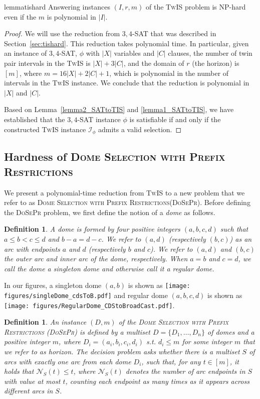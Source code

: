 \documentclass[letterpaper,11pt]{article}
\newtheorem{definition}[theorem]{Definition}
\newcommand{\sssattt}{\textsc{$3,4$-SAT}\xspace}
\newcommand{\tis}{\textsc{TwIS}\xspace}
\newcommand{\dspr}{\textsc{DoSePr}\xspace}
\newcommand{\dsprlong}{\textsc{Dome Selection with Prefix Restrictions}\xspace}
\begin{document}
\begin{restatable}{lemma}{tishard}\label{thm:1}
Answering instances $(I,r,m)$ of the \tis problem is NP-hard even if the $m$ is polynomial in $|I|$. 
\end{restatable}

\begin{proof}We will use the reduction from \sssattt that was described in Section~\ref{sec:tishard}. This reduction takes polynomial time. 
In particular, given an instance of \sssattt, $\phi$ with $|X|$ variables and $|C|$ clauses, the number of twin pair intervals in the \tis is $|X|+3|C|$, and the domain of $r$ (the horizon) is $[m]$, where $m=16|X|+2|C|+1$, which is polynomial in the number of intervals in the \tis instance. We conclude that the reduction is polynomial in $|X|$ and $|C|$.

    Based on Lemma~\ref{lemma2_SATtoTIS} and  \ref{lemma1_SATtoTIS}, we have established that the \sssattt instance $\phi$ is satisfiable if and only if the constructed \tis instance $\mathcal{I}_\phi$ admits a valid selection. 
\end{proof}



  \subsection{Hardness of \dsprlong}\label{subsec:hardness:dspr}
We present a polynomial-time reduction from \tis to a new problem that we refer to as \dsprlong (\dspr).
Before defining the \dspr problem, we first define the notion of a \emph{dome} as follows.

\begin{definition}
    A \emph{dome} is formed by four positive integers $(a,b,c,d)$ such that $a \leq b < c \leq d$ and $b-a=d-c$. We refer to $(a,d)$ (respectively $(b,c)$) as an \emph{arc} with endpoints $a$ and $d$ (respectively $b$ and $c$). We refer to $(a,d)$ and $(b,c)$ the \emph{outer arc} and \emph{inner arc} of the dome, respectively. When $a=b$ and $c=d$, we call the dome a \emph{singleton dome} and otherwise call it a \emph{regular dome}.
\end{definition}

 In our figures, a singleton dome $(a,b)$ is shown as \texttt{[image: figures/singleDome\_cdsToB.pdf]} and regular dome $(a,b,c,d)$ is shown as \texttt{[image: figures/RegularDome\_CDStoBroadCast.pdf]}. 


\begin{definition}
    An instance $(D,m)$ of the \emph{\dsprlong} (\dspr) is defined by a multiset $D= \{D_1,\ldots, D_n\}$ of domes and a positive integer $m$, where $D_i = (a_i,b_i,c_i,d_i)$ s.t. $d_i \leq m$ for some integer $m$ that we refer to as \emph{horizon}. The decision problem asks whether there is a multiset $S$ of arcs with exactly one arc from each dome $D_i$, such that, for any $t \in [m]$, it holds that $\mathcal{N}_S(t) \leq t$, where $\mathcal{N}_S(t)$ denotes the number of arc endpoints in $S$ with value at most $t$, counting each endpoint as many times as it appears across different arcs in $S$.
\end{definition}
\end{document}
